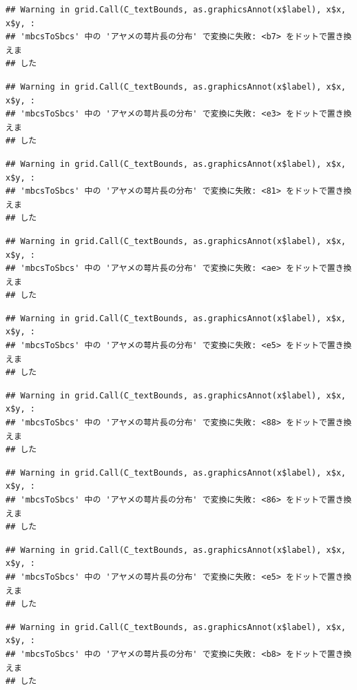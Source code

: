 \documentclass[
]{book}
\begin{document}
\begin{verbatim}
## Warning in grid.Call(C_textBounds, as.graphicsAnnot(x$label), x$x, x$y, :
## 'mbcsToSbcs' 中の 'アヤメの萼片長の分布' で変換に失敗: <b7> をドットで置き換えま
## した
\end{verbatim}

\begin{verbatim}
## Warning in grid.Call(C_textBounds, as.graphicsAnnot(x$label), x$x, x$y, :
## 'mbcsToSbcs' 中の 'アヤメの萼片長の分布' で変換に失敗: <e3> をドットで置き換えま
## した
\end{verbatim}

\begin{verbatim}
## Warning in grid.Call(C_textBounds, as.graphicsAnnot(x$label), x$x, x$y, :
## 'mbcsToSbcs' 中の 'アヤメの萼片長の分布' で変換に失敗: <81> をドットで置き換えま
## した
\end{verbatim}

\begin{verbatim}
## Warning in grid.Call(C_textBounds, as.graphicsAnnot(x$label), x$x, x$y, :
## 'mbcsToSbcs' 中の 'アヤメの萼片長の分布' で変換に失敗: <ae> をドットで置き換えま
## した
\end{verbatim}

\begin{verbatim}
## Warning in grid.Call(C_textBounds, as.graphicsAnnot(x$label), x$x, x$y, :
## 'mbcsToSbcs' 中の 'アヤメの萼片長の分布' で変換に失敗: <e5> をドットで置き換えま
## した
\end{verbatim}

\begin{verbatim}
## Warning in grid.Call(C_textBounds, as.graphicsAnnot(x$label), x$x, x$y, :
## 'mbcsToSbcs' 中の 'アヤメの萼片長の分布' で変換に失敗: <88> をドットで置き換えま
## した
\end{verbatim}

\begin{verbatim}
## Warning in grid.Call(C_textBounds, as.graphicsAnnot(x$label), x$x, x$y, :
## 'mbcsToSbcs' 中の 'アヤメの萼片長の分布' で変換に失敗: <86> をドットで置き換えま
## した
\end{verbatim}

\begin{verbatim}
## Warning in grid.Call(C_textBounds, as.graphicsAnnot(x$label), x$x, x$y, :
## 'mbcsToSbcs' 中の 'アヤメの萼片長の分布' で変換に失敗: <e5> をドットで置き換えま
## した
\end{verbatim}

\begin{verbatim}
## Warning in grid.Call(C_textBounds, as.graphicsAnnot(x$label), x$x, x$y, :
## 'mbcsToSbcs' 中の 'アヤメの萼片長の分布' で変換に失敗: <b8> をドットで置き換えま
## した
\end{verbatim}
\end{document}

